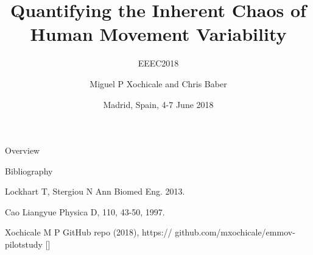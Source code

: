 \documentclass[compress]{beamer}
\title{
	Quantifying the Inherent Chaos of \\ 
	Human Movement Variability
	}
\subtitle{EEEC2018}
\date{Madrid, Spain, 4-7 June 2018}
\author{Miguel P Xochicale and Chris Baber}
\institute{School of Engineering \\{\bf University of Birmingham}}
\begin{document}

\maketitle

\begin{frame}{Overview}
\tableofcontents
\end{frame}



%
%

%






\begin{frame}{Bibliography}
    \begin{thebibliography}{10}

\beamertemplatearticlebibitems


      Lockhart T, Stergiou N 
      \newblock {}
	\newblock Ann Biomed Eng. 2013.

      Cao Liangyue
      \newblock {}
      \newblock Physica D, 110, 43-50, 1997.  

      Xochicale M P
      \newblock {}
      \newblock GitHub repo (2018), https:// github.com/mxochicale/emmov-pilotstudy [\href{https:// github.com/mxochicale/emmov-pilotstudy}{\faGithub}]


    \end{thebibliography}
\end{frame}




\closingtitle


\end{document}
